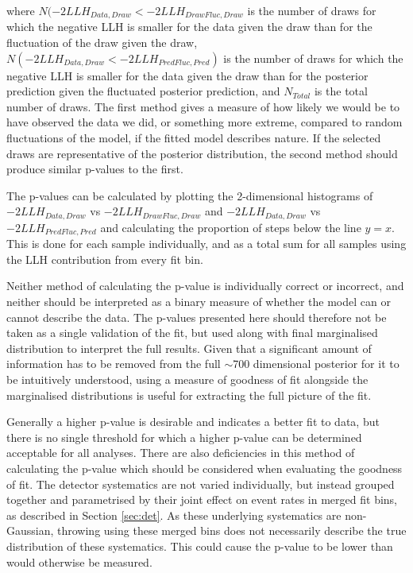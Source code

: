 where $N(-2LLH_{Data, Draw} < -2LLH_{Draw Fluc, Draw}$ is the number of draws for which the negative LLH is smaller for the data given the draw than for the fluctuation of the draw given the draw, $N(-2LLH_{Data, Draw} < -2LLH_{Pred Fluc, Pred})$ is the number of draws for which the negative LLH is smaller for the data given the draw than for the posterior prediction given the fluctuated posterior prediction, and $N_{Total}$ is the total number of draws. The first method gives a measure of how likely we would be to have observed the data we did, or something more extreme, compared to random fluctuations of the model, if the fitted model describes nature. If the selected draws are representative of the posterior distribution, the second method should produce similar p-values to the first.

The p-values can be calculated by plotting the 2-dimensional histograms of\\ $-2LLH_{Data, Draw}$ vs $-2LLH_{Draw Fluc, Draw}$ and $-2LLH_{Data, Draw}$ vs $-2LLH_{Pred Fluc, Pred}$ and calculating the proportion of steps below the line $y=x$. This is done for each sample individually, and as a total sum for all samples using the LLH contribution from every fit bin. 

Neither method of calculating the p-value is individually correct or incorrect, and neither should be interpreted as a binary measure of whether the model can or cannot describe the data. The p-values presented here should therefore not be taken as a single validation of the fit, but used along with final marginalised distribution to interpret the full results. Given that a significant amount of information has to be removed from the full $\sim$700 dimensional posterior for it to be intuitively understood, using a measure of goodness of fit alongside the marginalised distributions is useful for extracting the full picture of the fit.

Generally a higher p-value is desirable and indicates a better fit to data, but there is no single threshold for which a higher p-value can be determined acceptable for all analyses. There are also deficiencies in this method of calculating the p-value which should be considered when evaluating the goodness of fit. The detector systematics are not varied individually, but instead grouped together and parametrised by their joint effect on event rates in merged fit bins, as described in Section \ref{sec:det}. As these underlying systematics are non-Gaussian, throwing using these merged bins does not necessarily describe the true distribution of these systematics. This could cause the p-value to be lower than would otherwise be measured.

